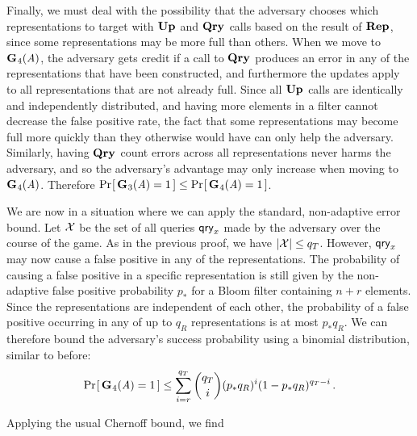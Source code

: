 Finally, we must deal with the possibility that the adversary chooses which representations to target with $\textup{\textbf{Up}}\hspace{0.5pt}$ and $\textup{\textbf{Qry}}\hspace{0.5pt}$ calls based on the result of $\textup{\textbf{Rep}}\hspace{0.5pt}$, since some representations may be more full than others. When we move to~$\textup{\textbf{G}}\hspace{0.5pt}_4(\mathit{A})$, the adversary gets credit if a call to $\textup{\textbf{Qry}}\hspace{0.5pt}$ produces an error in any of the representations that have been constructed, and furthermore the updates apply to all representations that are not already full. Since all $\textup{\textbf{Up}}\hspace{0.5pt}$ calls are identically and independently distributed, and having more elements in a filter cannot decrease the false positive rate, the fact that some representations may become full more quickly than they otherwise would have can only help the adversary. Similarly, having $\textup{\textbf{Qry}}\hspace{0.5pt}$ count errors across all representations never harms the adversary, and so the adversary's advantage may only increase when moving to~$\textup{\textbf{G}}\hspace{0.5pt}_4(\mathit{A})$. Therefore $\Pr\hspace{-1pt}\left[\,\textup{\textbf{G}}\hspace{0.5pt}_3(\mathit{A}) = 1\,\right] \le \Pr\hspace{-1pt}\left[\,\textup{\textbf{G}}\hspace{0.5pt}_4(\mathit{A}) = 1\,\right]$.

We are now in a situation where we can apply the standard, non-adaptive error bound. Let $\mathcal{X}$ be the set of all queries $\mathsf{qry}_x$ made by the adversary over the course of the game. As in the previous proof, we have $|\mathcal{X}| \le q_T$. However, $\mathsf{qry}_x$ may now cause a false positive in any of the representations. The probability of causing a false positive in a specific representation is still given by the non-adaptive false positive probability $p_*$ for a Bloom filter containing $n+r$ elements. Since the representations are independent of each other, the probability of a false positive occurring in any of up to $q_R$ representations is at most $p_*q_R$. We can therefore bound the adversary's success probability using a binomial distribution, similar to before:
\begin{equation}
   \Pr\hspace{-1pt}\left[\,\textup{\textbf{G}}\hspace{0.5pt}_4(\mathit{A})=1\,\right] \le
     \sum_{i=r}^{q_T} \binom{q_T}{i}(p_*q_R)^i(1-p_*q_R)^{q_T-i} \,.
\end{equation}

Applying the usual Chernoff bound, we find